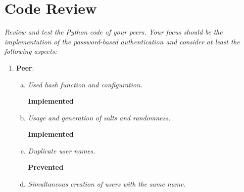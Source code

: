 \section{Code Review}
{\itshape Review and test the Python code of your peers. Your focus should be the implementation of the password-based authentication and consider at least the following aspects:}
\begin{enumerate}[1.]
    \item \textbf{Peer}:
    \begin{enumerate}[(a)]
        \item {\itshape Used hash function and configuration.}
        
        \textbf{Implemented}
        
        
        \item {\itshape Usage and generation of salts and randomness.}
        
        \textbf{Implemented}
        

        \item {\itshape Duplicate user names.}
        
        \textbf{Prevented}
        
\newpage    
        \item {\itshape Simultaneous creation of users with the same name.}
        

\end{enumerate}
\end{enumerate}
